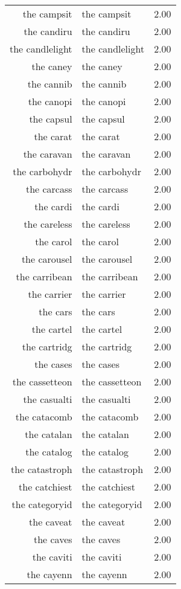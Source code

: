 \begin{table}[ht]
\begin{tabular}{rlr}
  the campsit & the campsit & 2.00 \\ 
  the candiru & the candiru & 2.00 \\ 
  the candlelight & the candlelight & 2.00 \\ 
  the caney & the caney & 2.00 \\ 
  the cannib & the cannib & 2.00 \\ 
  the canopi & the canopi & 2.00 \\ 
  the capsul & the capsul & 2.00 \\ 
  the carat & the carat & 2.00 \\ 
  the caravan & the caravan & 2.00 \\ 
  the carbohydr & the carbohydr & 2.00 \\ 
  the carcass & the carcass & 2.00 \\ 
  the cardi & the cardi & 2.00 \\ 
  the careless & the careless & 2.00 \\ 
  the carol & the carol & 2.00 \\ 
  the carousel & the carousel & 2.00 \\ 
  the carribean & the carribean & 2.00 \\ 
  the carrier & the carrier & 2.00 \\ 
  the cars & the cars & 2.00 \\ 
  the cartel & the cartel & 2.00 \\ 
  the cartridg & the cartridg & 2.00 \\ 
  the cases & the cases & 2.00 \\ 
  the cassetteon & the cassetteon & 2.00 \\ 
  the casualti & the casualti & 2.00 \\ 
  the catacomb & the catacomb & 2.00 \\ 
  the catalan & the catalan & 2.00 \\ 
  the catalog & the catalog & 2.00 \\ 
  the catastroph & the catastroph & 2.00 \\ 
  the catchiest & the catchiest & 2.00 \\ 
  the categoryid & the categoryid & 2.00 \\ 
  the caveat & the caveat & 2.00 \\ 
  the caves & the caves & 2.00 \\ 
  the caviti & the caviti & 2.00 \\ 
  the cayenn & the cayenn & 2.00 \\ 

\end{tabular}
\end{table}
